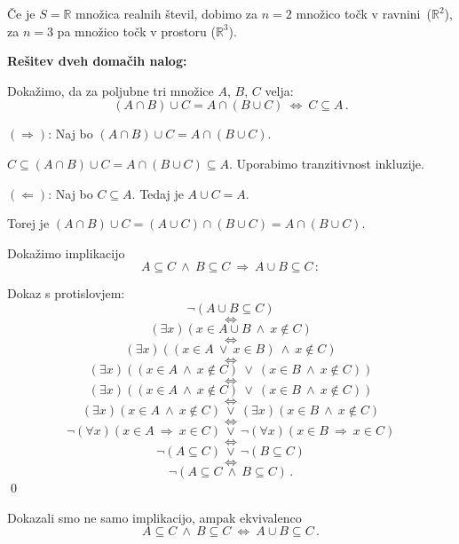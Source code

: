 \documentclass[11pt,paper=b5,footinclude,headinclude]{scrbook} %
\newcounter{example}
\def\ali {{~\vee~}}
\def\inn {{~\wedge~}}
\def\sledi {{~\Rightarrow~}}
\def\cee {{~\Leftrightarrow~}}
\begin{document}
\begin{example*}
Če je $S = \mathbb{R}$ množica realnih števil,
dobimo za $n = 2$ množico točk v ravnini~($\mathbb{R}^2$), za
$n = 3$ pa množico točk v prostoru ($\mathbb{R}^3$).\end{example*}

\bigskip

%
%
\bigskip
\textbf{ Rešitev dveh domačih nalog:}

Dokažimo, da za poljubne tri množice $A$, $B$, $C$ velja:
$$(A\cap B)\cup C = A\cap (B\cup C) \cee C\subseteq A\,.$$

\medskip
$(\Rightarrow)$:
Naj bo $(A\cap B)\cup C = A\cap (B\cup C)$.

$C\subseteq (A\cap B)\cup C = A\cap (B\cup C)\subseteq A$. Uporabimo tranzitivnost inkluzije.

\medskip
$(\Leftarrow)$:
Naj bo $C\subseteq A$. Tedaj je $A\cup C = A$.

Torej je
$(A\cap B)\cup C = (A\cup C)\cap (B\cup C) = A\cap (B\cup C)$.

\bigskip
Dokažimo implikacijo
$$A\subseteq C\inn B\subseteq C\sledi A\cup B \subseteq C\,:$$

Dokaz s protislovjem:
$$\neg(A\cup B\subseteq C)$$
$$\cee$$
$$(\exists x)(x\in A\cup B\inn x\not\in C)$$
$$\cee$$
$$(\exists x)((x\in A \ali x\in B)\inn x\not\in C)$$
$$\cee$$
$$(\exists x)((x\in A \inn x\not\in C) \ali (x\in B\inn x\not\in C))$$
$$\cee$$
$$(\exists x)((x\in A \inn x\not\in C) \ali (x\in B\inn x\not\in C))$$
$$\cee$$
$$(\exists x)(x\in A \inn x\not\in C) \ali (\exists x)(x\in B\inn x\not\in C)$$
$$\cee$$
$$\neg(\forall x)(x\in A\sledi x\in C)\ali\neg(\forall x)(x\in B\sledi x\in C)$$
$$\cee$$
$$\neg(A \subseteq C) \ali \neg(B\subseteq C)$$
$$\cee$$
$$\neg(A \subseteq C \inn B\subseteq C)\,.$$
\qed

Dokazali smo ne samo implikacijo, ampak ekvivalenco
$$A\subseteq C\inn B\subseteq C\cee A\cup B \subseteq C\,.$$
\end{document}

